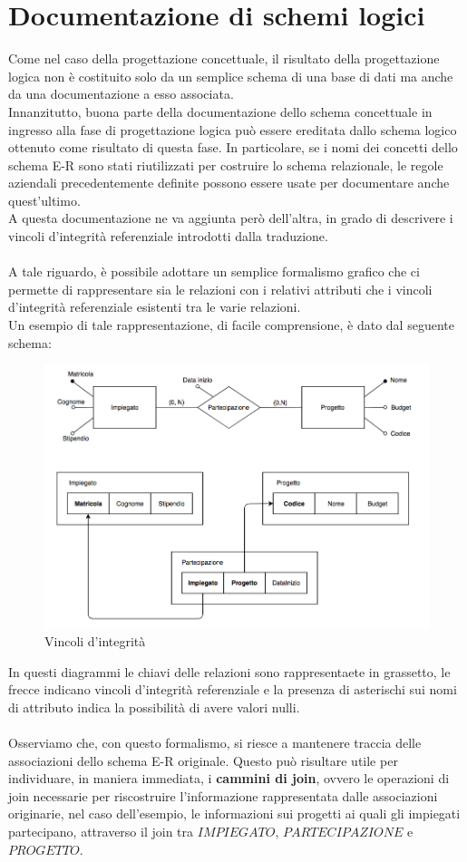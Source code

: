 \section{Documentazione di schemi logici}
Come nel caso della progettazione concettuale, il risultato della progettazione logica non è costituito solo da un semplice schema di una base di dati ma anche da una documentazione a esso associata.\\
Innanzitutto, buona parte della documentazione dello schema concettuale in ingresso alla fase di progettazione logica può essere ereditata dallo schema logico ottenuto come risultato di questa fase. In particolare, se i nomi dei concetti dello schema E-R sono stati riutilizzati per costruire lo schema relazionale, le regole aziendali precedentemente definite possono essere usate per documentare anche quest'ultimo.\\
A questa documentazione ne va aggiunta però dell'altra, in grado di descrivere i vincoli d'integrità referenziale introdotti dalla traduzione.\\\\
A tale riguardo, è possibile adottare un semplice formalismo grafico che ci permette di rappresentare sia le relazioni con i relativi attributi che i vincoli d'integrità referenziale esistenti tra le varie relazioni.\\
Un esempio di tale rappresentazione, di facile comprensione, è dato dal seguente schema:
    \begin{figure}[h!]
        \centering
        \includegraphics[scale = 0.5]{15/img12}
        \caption{Vincoli d'integrità}
    \end{figure}
In questi diagrammi le chiavi delle relazioni sono rappresentaete in grassetto, le frecce indicano vincoli d'integrità referenziale e la presenza di asterischi sui nomi di attributo indica la possibilità di avere valori nulli.\\\\
Osserviamo che, con questo formalismo, si riesce a mantenere traccia delle associazioni dello schema E-R originale. Questo può risultare utile per individuare, in maniera immediata, i \textbf{cammini di join}, ovvero le operazioni di join necessarie per riscostruire l'informazione rappresentata dalle associazioni originarie, nel caso dell'esempio, le informazioni sui progetti ai quali gli impiegati partecipano, attraverso il join tra $IMPIEGATO$, $PARTECIPAZIONE$ e $PROGETTO$.
